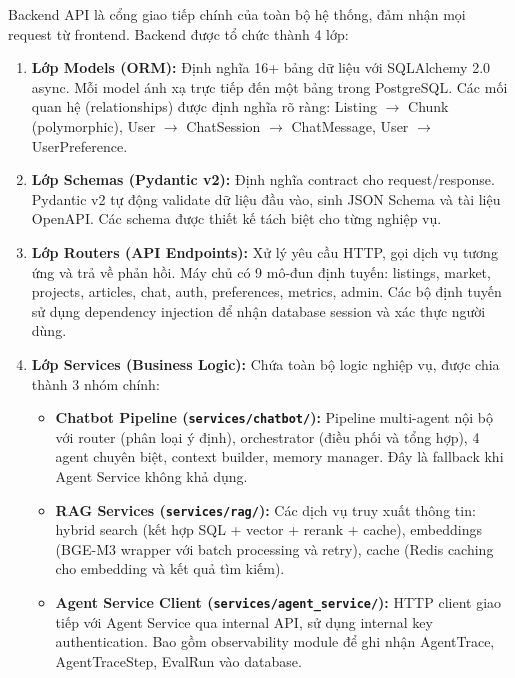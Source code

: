 Backend API là cổng giao tiếp chính của toàn bộ hệ thống, đảm nhận mọi request từ frontend. Backend được tổ chức thành 4 lớp:

\begin{enumerate}
    \item \textbf{Lớp Models (ORM):} Định nghĩa 16+ bảng dữ liệu với SQLAlchemy 2.0 async. Mỗi model ánh xạ trực tiếp đến một bảng trong PostgreSQL. Các mối quan hệ (relationships) được định nghĩa rõ ràng: Listing $\rightarrow$ Chunk (polymorphic), User $\rightarrow$ ChatSession $\rightarrow$ ChatMessage, User $\rightarrow$ UserPreference.

    \item \textbf{Lớp Schemas (Pydantic v2):} Định nghĩa contract cho request/response. Pydantic v2 tự động validate dữ liệu đầu vào, sinh JSON Schema và tài liệu OpenAPI. Các schema được thiết kế tách biệt cho từng nghiệp vụ.

    \item \textbf{Lớp Routers (API Endpoints):} Xử lý yêu cầu HTTP, gọi dịch vụ tương ứng và trả về phản hồi. Máy chủ có 9 mô-đun định tuyến: listings, market, projects, articles, chat, auth, preferences, metrics, admin. Các bộ định tuyến sử dụng dependency injection để nhận database session và xác thực người dùng.

    \item \textbf{Lớp Services (Business Logic):} Chứa toàn bộ logic nghiệp vụ, được chia thành 3 nhóm chính:
    \begin{itemize}
        \item \textbf{Chatbot Pipeline (\texttt{services/chatbot/}):} Pipeline multi-agent nội bộ với router (phân loại ý định), orchestrator (điều phối và tổng hợp), 4 agent chuyên biệt, context builder, memory manager. Đây là fallback khi Agent Service không khả dụng.
        \item \textbf{RAG Services (\texttt{services/rag/}):} Các dịch vụ truy xuất thông tin: hybrid search (kết hợp SQL + vector + rerank + cache), embeddings (BGE-M3 wrapper với batch processing và retry), cache (Redis caching cho embedding và kết quả tìm kiếm).
        \item \textbf{Agent Service Client (\texttt{services/agent\_service/}):} HTTP client giao tiếp với Agent Service qua internal API, sử dụng internal key authentication. Bao gồm observability module để ghi nhận AgentTrace, AgentTraceStep, EvalRun vào database.
    \end{itemize}
\end{enumerate}

